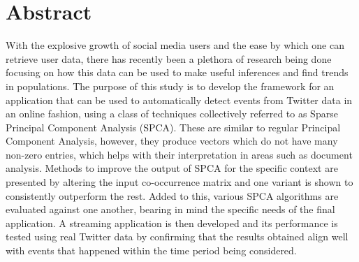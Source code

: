 \documentclass[11pt,a4paper]{article}
\begin{document}

\newpage




\section*{\center Abstract}

With the explosive growth of social media users and the ease by which one can retrieve user data, there has recently been a plethora of research being done focusing on how this data can be used to make useful inferences and find trends in populations. The purpose of this study is to develop the framework for an application that can be used to automatically detect events from Twitter data in an online fashion, using a class of techniques collectively referred to as Sparse Principal Component Analysis (SPCA). These are similar to regular Principal Component Analysis, however, they produce vectors which do not have many non-zero entries, which helps with their interpretation in areas such as document analysis. Methods to improve the output of SPCA for the specific context are presented by altering the input co-occurrence matrix and one variant is shown to consistently outperform the rest. Added to this, various SPCA algorithms are evaluated against one another, bearing in mind the specific needs of the final application. A streaming application is then developed and its performance is tested using real Twitter data by confirming that the results obtained align well with events that happened within the time period being considered. 
\end{document}
